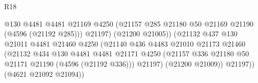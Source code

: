 \begin{lexlean}{R18}
\begin{coremodule}
                                                  @130
                                                  @4481
                                                  @4481
                                                  @21169
                                                  @4250
                                                  (@21157
                                                    @285
                                                    @21180
                                                    @50
                                                    @21169
                                                    @21190
                                                    (@4596 (@21192 @285)))
                                                  @21197)
                                                (@21200 @21005))
                                              (@21132
                                                @437
                                                @130
                                                @21011
                                                @4481
                                                @21460
                                                @4250
                                                (@21140
                                                  @436
                                                  @4483
                                                  @21010
                                                  @21173
                                                  @21460
                                                  (@21132
                                                    @434
                                                    @130
                                                    @4481
                                                    @4481
                                                    @21171
                                                    @4250
                                                    (@21157
                                                      @336
                                                      @21180
                                                      @50
                                                      @21171
                                                      @21190
                                                      (@4596 (@21192 @336)))
                                                    @21197)
                                                  (@21200 @21009))
                                                @21197))
                                            (@4621 @21092 @21094))

\end{coremodule}
\end{lexlean}
